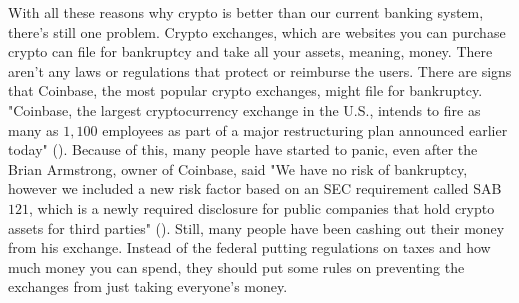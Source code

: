 \begin{essay}

  With all these reasons why crypto is better than our current banking system,
  there's still one problem. Crypto exchanges, which are websites you can
  purchase crypto can file for bankruptcy and take all your assets, meaning,
  money. There aren't any laws or regulations that protect or reimburse the
  users. There are signs that Coinbase, the most popular crypto exchanges,
  might file for bankruptcy. "Coinbase, the largest cryptocurrency exchange in
  the U.S., intends to fire as many as $1,100$ employees as part of a major
  restructuring plan announced earlier today" (\cite{dovbnya_breaking_2022}).
  Because of this, many people have started to panic, even after the Brian
  Armstrong, owner of Coinbase, said "We have no risk of bankruptcy, however we
  included a new risk factor based on an SEC requirement called SAB $121$, which
  is a newly required disclosure for public companies that hold crypto assets
  for third parties" (\cite{armstrong_2_2022}). Still, many people have been
  cashing out their money from his exchange. Instead of the federal putting
  regulations on taxes and how much money you can spend, they should put some
  rules on preventing the exchanges from just taking everyone's money.



\end{essay}
